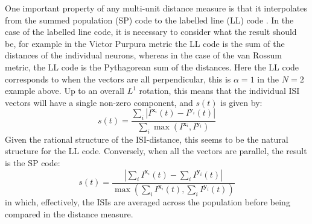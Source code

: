 One important property of any multi-unit distance measure is that it interpolates from the summed population (SP) code  to the labelled line (LL) code .  In the case of the labelled line code, it is necessary to consider what the result should be, for example in the Victor Purpura metric the LL code is the sum of the distances of the individual neurons, whereas in the case of the van Rossum metric, the LL code is the Pythagorean sum of the distances.  Here the LL code corresponds to when the vectors are all perpendicular,   this is $\alpha=1$ in the $N=2$ example above.  Up to an overall $L^1$ rotation, this means that the individual ISI vectors will have a single non-zero component, and $s(t)$ is given by:
\begin{equation}
s(t) = \frac{\sum_i | I^{\mathbf{x}_i} (t)  - I^{\mathbf{y}_i}(t)|}{\sum_i \max (I^{\mathbf{x}_i},I^{\mathbf{y}_i})}
 \end{equation}
 Given the rational structure of the ISI-distance, this seems to be the natural structure for the LL code.  
Conversely, when all the vectors are parallel, the result is the SP code:
\begin{equation}
s(t) = \frac{| \sum_i I^{\mathbf{x}_i}(t) - \sum_i I^{\mathbf{y}_i}(t) |}{\max (\sum_i I^{\mathbf{x}_i}(t),\sum_i I^{\mathbf{y}_i}(t) )}
\end{equation}
in which, effectively, the ISIs are averaged across the population before being compared in the distance measure.
%
%


